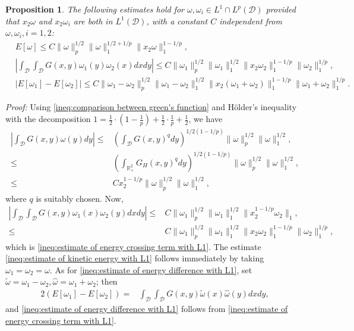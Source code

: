 \documentclass[11pt,letterpaper]{amsart}
\newtheorem{prop}[thm]{Proposition}
\theoremstyle{definition}
\theoremstyle{remark}
\newcommand{\D}{\mathcal{D}}
\newcommand{\R}{\mathbb{R}}
\numberwithin{equation}{section}
\begin{document}
\begin{prop}\label{prop:estimate for kinetic energy with L1}
    The following estimates hold for $\omega,\omega_i\in L^1\cap L^p(\D)$ provided that $x_2\omega$ and $x_2\omega_i$ are both in $L^1(\D)$, with a constant $C$ independent from $\omega,\omega_i, i=1,2$:
    \begin{align}
        &E[\omega]\leq C\|\omega\|_p^{1/2}\|\omega\|_1^{1/2+1/p}\|x_2\omega\|_1^{1-1/p},  \label{ineq:estimate of kinetic energy with L1}
        \\
        &\left|\int_{\D}\int_{\D}G(x,y)\omega_1(y)\omega_2(x)dxdy\right|\leq C\|\omega_1\|_p^{1/2}\|\omega_1\|_1^{1/2}\|x_2\omega_2\|_1^{1-1/p}\|\omega_2\|_1^{1/p}, \label{ineq:estimate of energy crossing term with L1}
        \\
        &|E[\omega_1]-E[\omega_2]|\leq C \|\omega_1-\omega_2\|_{p}^{1/2}\|\omega_1-\omega_2\|_{1}^{1/2}\|x_2(\omega_1+\omega_2)\|_{1}^{1-1/p}\|\omega_1+\omega_2\|_{1}^{1/p}. \label{ineq:estimate of energy difference with L1}
    \end{align}
\end{prop}
\noindent\textit{Proof: } Using \eqref{ineq:comparison between green's function} and Hölder’s inequality with the decomposition $1=\frac{1}{2}\cdot (1-\frac{1}{p})  + \frac{1}{2} \cdot \frac{1}{p} + \frac{1}{2}$, we have
\begin{align*}
    \left|\int_{\D}G(x,y)\omega(y)dy\right|\leq &  
    \left(\int_{\D}G(x,y)^qdy\right)^{1/2(1-1/p)}\|\omega\|_p^{1/2}\|\omega\|_1^{1/2}, \\
    \leq & \left(\int_{\R^2_+}G_H(x,y)^qdy\right)^{1/2(1-1/p)}\|\omega\|_p^{1/2}\|\omega\|_1^{1/2}, \\
    \leq & Cx_2^{1-1/p}\|\omega\|_p^{1/2}\|\omega\|_1^{1/2},
\end{align*}
where $q$ is suitably chosen. Now,
\begin{align*}
    \left|\int_{\D}\int_{\D}G(x,y)\omega_1(x)\omega_2(y)dxdy\right|
    \leq & C\|\omega_1\|_p^{1/2}\|\omega_1\|_1^{1/2}\|x_2^{1-1/p}\omega_2\|_1,\\
    \leq & C\|\omega_1\|_p^{1/2}\|\omega_1\|_1^{1/2}\|x_2\omega_2\|_1^{1-1/p}\|\omega_2\|_1^{1/p},
\end{align*}
which is \eqref{ineq:estimate of energy crossing term with L1}.
The estimate \eqref{ineq:estimate of kinetic energy with L1} follows immediately by taking $\omega_1=\omega_2=\omega$. As for \eqref{ineq:estimate of energy difference with L1}, set $\widetilde\omega=\omega_1-\omega_2, \widehat\omega=\omega_1+\omega_2$; then
\begin{align*}
    2(E[\omega_1]-E[\omega_2]) 
    = & \int_{\D}\int_{\D}G(x,y)\widetilde\omega(x)\widehat\omega(y)dxdy,
\end{align*}
and \eqref{ineq:estimate of energy difference with L1} follows from \eqref{ineq:estimate of energy crossing term with L1}.
\end{document}
